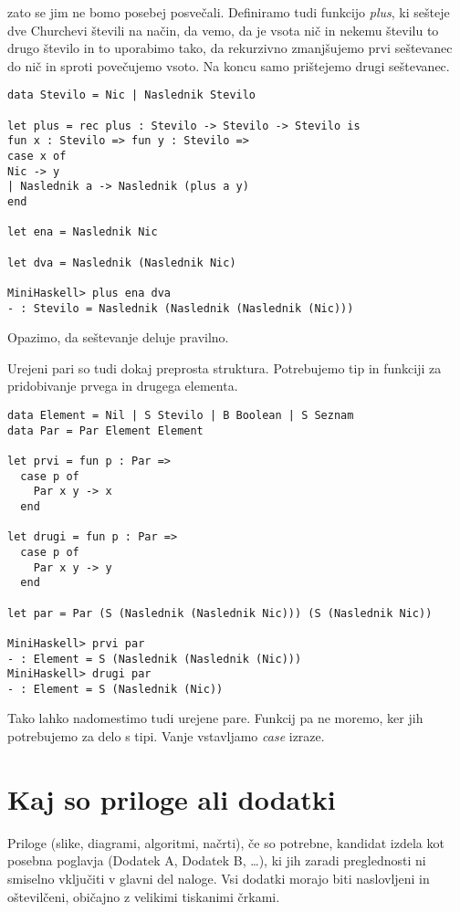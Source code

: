 \documentclass[12pt,a4paper,openany]{book}
\begin{document}
zato se jim ne bomo posebej posvečali. Definiramo tudi funkcijo \emph{plus}, ki sešteje dve Churchevi števili na način, da vemo, da je vsota nič in nekemu številu to drugo število in to uporabimo tako, da rekurzivno 
zmanjšujemo prvi seštevanec do nič in sproti povečujemo vsoto. Na koncu samo prištejemo drugi seštevanec.
\begin{lstlisting}
data Stevilo = Nic | Naslednik Stevilo

let plus = rec plus : Stevilo -> Stevilo -> Stevilo is
fun x : Stevilo => fun y : Stevilo =>
case x of
Nic -> y
| Naslednik a -> Naslednik (plus a y)
end

let ena = Naslednik Nic

let dva = Naslednik (Naslednik Nic)

MiniHaskell> plus ena dva
- : Stevilo = Naslednik (Naslednik (Naslednik (Nic)))
\end{lstlisting}
Opazimo, da seštevanje deluje pravilno. 

Urejeni pari so tudi dokaj preprosta struktura. Potrebujemo tip in funkciji za pridobivanje prvega in drugega elementa.
\begin{lstlisting}
data Element = Nil | S Stevilo | B Boolean | S Seznam
data Par = Par Element Element

let prvi = fun p : Par =>
  case p of 
    Par x y -> x
  end

let drugi = fun p : Par =>
  case p of 
    Par x y -> y
  end

let par = Par (S (Naslednik (Naslednik Nic))) (S (Naslednik Nic))

MiniHaskell> prvi par
- : Element = S (Naslednik (Naslednik (Nic)))
MiniHaskell> drugi par
- : Element = S (Naslednik (Nic))
\end{lstlisting}
Tako lahko nadomestimo tudi urejene pare. Funkcij pa ne moremo, ker jih potrebujemo za delo s tipi. Vanje vstavljamo \emph{case} izraze. 

\newpage


\appendix


\chapter{Kaj so priloge ali dodatki}

Priloge (slike, diagrami, algoritmi, načrti), 
če so potrebne, kandidat izdela kot posebna poglavja (Dodatek A, Dodatek B, \ldots), ki jih zaradi preglednosti ni smiselno vključiti v glavni
del naloge. Vsi dodatki morajo biti naslovljeni in oštevilčeni, običajno z velikimi tiskanimi črkami. 
\end{document}
